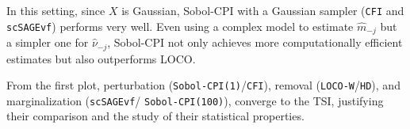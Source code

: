 \documentclass{article}
\theoremstyle{plain}
\theoremstyle{definition}
\theoremstyle{remark}
\begin{document}


In this setting, since $X$ is Gaussian, Sobol-CPI with a Gaussian sampler (\texttt{CFI} and \texttt{scSAGEvf}) performs very well. Even using a complex model to estimate $\widehat{m}_{-j}$ but a simpler one for $\widehat{\nu}_{-j}$, Sobol-CPI not only achieves more computationally efficient estimates but also outperforms LOCO.  

From the first plot, perturbation (\texttt{Sobol-CPI(1)}/\texttt{CFI}), removal (\texttt{LOCO-W}/\texttt{HD}), and marginalization (\texttt{scSAGEvf}/ \texttt{Sobol-CPI(100)}), converge to the TSI, justifying their comparison and the study of their statistical properties.  
\end{document}
